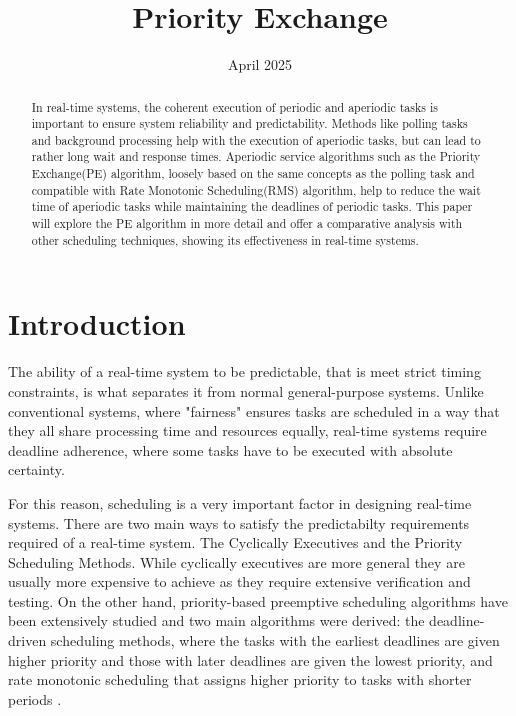\documentclass[conference]{IEEEtran}
\title{Priority Exchange}
\author{
    \IEEEauthorblockN{Mofifoluwa Ipadeola Akinwande}
    \IEEEauthorblockA{
        \textit{Electronic Engineering} \\
        \textit{Hochschule Hamm-Lippstadt}\\
        Lippstadt, Germany \\
        mofifoluwa-ipadeola.akinwande@stud.hshl.de
    }
}
\date{April 2025}
\begin{document}
\maketitle

\begin{abstract}
In real-time systems, the coherent execution of periodic and aperiodic tasks is important to ensure system reliability and predictability. Methods like polling tasks and background processing help with the execution of aperiodic tasks, but can lead to rather long wait and response times. Aperiodic service algorithms such as the Priority Exchange(PE) algorithm, loosely based on the same concepts as the polling task and compatible with Rate Monotonic Scheduling(RMS) algorithm, help to reduce the wait time of aperiodic tasks while maintaining the deadlines of periodic tasks. This paper will explore the PE algorithm in more detail and offer a comparative analysis with other scheduling techniques, showing its effectiveness in real-time systems.
 
\end{abstract}

\section{Introduction}
The ability of a real-time system to be predictable, that is meet strict timing constraints, is what separates it from normal general-purpose systems. Unlike conventional systems, where "fairness" ensures tasks are scheduled in a way that they all share processing time and resources equally, real-time systems require deadline adherence, where some tasks have to be executed with absolute certainty. 

For this reason, scheduling is a very important factor in designing real-time systems. There are two main ways to satisfy the predictabilty requirements required of a real-time system. The Cyclically Executives and the Priority Scheduling Methods. While cyclically executives are more general they are usually more expensive to achieve as they require extensive verification and testing.  On the other hand, priority-based preemptive scheduling algorithms have been extensively studied and two main algorithms were derived: the deadline-driven scheduling methods, where the tasks with the earliest deadlines are given higher priority and those with later deadlines are given the lowest priority, and rate monotonic scheduling that assigns higher priority to tasks with shorter periods \cite{liu1973scheduling}.
\end{document}
